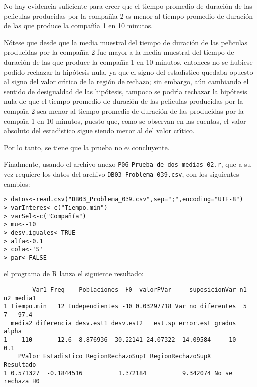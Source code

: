 \begin{solucion}
 \begin{conclusion}
  No hay evidencia suficiente para creer
  que el tiempo promedio de duraci\'on de las pel\'{\i}culas producidas
  por la compa\~n\'{\i}a 2 es menor al tiempo promedio de duraci\'on
  de las que produce la compa\~n\'{\i}a 1 en 10 minutos.
  \par 
  N\'otese que desde que la media muestral del tiempo de duraci\'on
  de las pel\'{\i}culas producidas por la compa\~n\'{\i}a 2 fue mayor
  a la media muestral del tiempo de duraci\'on de las que produce
  la compa\~n\'{\i}a 1 en 10 minutos, entonces no se hubiese
  podido rechazar la hip\'otesis nula,
  ya que el signo del estad\'{\i}stico quedaba opuesto al signo del
  valor cr\'{\i}tico de la regi\'on de rechazo;
  sin embargo, a\'un cambiando el sentido de desigualdad
  de las hip\'otesis, tampoco se podr\'{\i}a rechazar la hip\'otesis
  nula de que el tiempo promedio de duraci\'on de las pel\'{\i}culas
  producidas por la compa\~{\i}a 2 sea menor al tiempo promedio
  de duraci\'on de las producidas por la compa\~{\i}a 1
  en 10 minutos,
  puesto que, como se observan en las cuentas, el valor absoluto
  del estad\'{\i}stico sigue siendo menor al del valor cr\'{\i}tico.
  \par 
  Por lo tanto, se tiene que la prueba no es concluyente.
 \end{conclusion}
 Finalmente, usando el archivo anexo
 \texttt{P06\_Prueba\_de\_dos\_medias\_02.r},
 que a su vez requiere los datos del archivo
 \texttt{DB03\_Problema\_039.csv},
 con los siguientes cambios:
 \begin{verbatim}
> datos<-read.csv("DB03_Problema_039.csv",sep=";",encoding="UTF-8")
> varInteres<-c("Tiempo.min")
> varSel<-c("Compañía")
> mu<--10
> desv.iguales<-TRUE
> alfa<-0.1
> cola<-'S'
> par<-FALSE
 \end{verbatim}
 \vspace{-0.5cm}
 el programa de R lanza el siguiente resultado:
 \begin{verbatim}
        Var1 Freq    Poblaciones  H0  valorPVar     suposicionVar n1 n2 media1
1 Tiempo.min   12 Independientes -10 0.03297718 Var no diferentes  5  7   97.4
  media2 diferencia desv.est1 desv.est2   est.sp error.est grados alpha
1    110      -12.6  8.876936  30.22141 24.07322  14.09584     10   0.1
    PValor Estadistico RegionRechazoSupT RegionRechazoSupX        Resultado
1 0.571327  -0.1844516          1.372184          9.342074 No se rechaza H0
 \end{verbatim}
 \vspace{-0.5cm}

\end{solucion}

